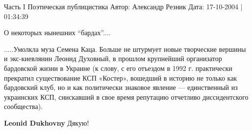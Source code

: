 \begin{itemize}
\begin{itemize}
Часть I Поэтическая публицистика Автор: Александр Резник Дата: 17-10-2004 |
01:34:39

О некоторых нынешних \enquote{бардах}....

.....Умолкла муза Семена Каца. Больше не штурмует новые творческие вершины и
экс-киевлянин Леонид Духовный, в прошлом крупнейший организатор бардовской
жизни в Украине (к слову, с его отъездом в 1992 г. практически прекратил
существование КСП «Костер», вошедший в историю не только как бардовский клуб,
но и как политически знаковое явление — единственный из украинских КСП,
снискавший в свое время репутацию отчетливо диссидентского сообщества).

\textbf{Leonid Dukhovny} Дякую!
\end{itemize} %


\end{itemize} %
